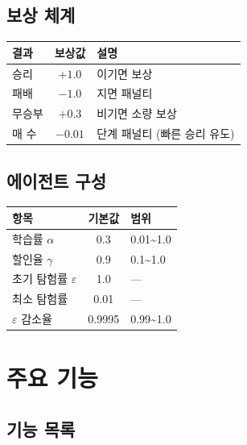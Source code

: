 \documentclass[11pt,a4paper]{article}
\begin{document}
\subsection{보상 체계}

\begin{center}
\renewcommand{\arraystretch}{1.4}
\begin{tabular}{|l|c|p{7cm}|}
\hline
\rowcolor{tableheader}
\textbf{결과} & \textbf{보상값} & \textbf{설명} \\
\hline
승리 & $+1.0$ & 이기면 보상 \\
\hline
패배 & $-1.0$ & 지면 패널티 \\
\hline
무승부 & $+0.3$ & 비기면 소량 보상 \\
\hline
매 수 & $-0.01$ & 단계 패널티 (빠른 승리 유도) \\
\hline
\end{tabular}
\end{center}

\subsection{에이전트 구성}

\begin{center}
\renewcommand{\arraystretch}{1.4}
\begin{tabular}{|l|c|l|}
\hline
\rowcolor{tableheader}
\textbf{항목} & \textbf{기본값} & \textbf{범위} \\
\hline
학습률 $\alpha$ & 0.3 & 0.01\textasciitilde1.0 \\
\hline
할인율 $\gamma$ & 0.9 & 0.1\textasciitilde1.0 \\
\hline
초기 탐험률 $\varepsilon$ & 1.0 & — \\
\hline
최소 탐험률 & 0.01 & — \\
\hline
$\varepsilon$ 감소율 & 0.9995 & 0.99\textasciitilde1.0 \\
\hline
\end{tabular}
\end{center}

\section{주요 기능}

\subsection{기능 목록}
\end{document}
